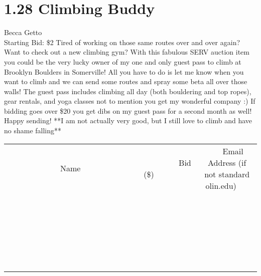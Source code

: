 \documentclass[11pt]{article}
\begin{document}
\section*{1.28 Climbing Buddy}
Becca Getto
\\
Starting Bid: \$2
\newline
Tired of working on those same routes over and over again? Want to check out a new climbing gym? With this fabulous SERV auction item you could be the very lucky owner of my one and only guest pass to climb at Brooklyn Boulders in Somerville! All you have to do is let me know when you want to climb and we can send some routes and spray some beta all over those walls! The guest pass includes climbing all day (both bouldering and top ropes), gear rentals, and yoga classes not to mention you get my wonderful company :) If bidding goes over \$20 you get dibs on my guest pass for a second month as well! Happy sending! **I am not actually very good, but I still love to climb and have no shame falling**
\\[6ex]
\begin{tabular}{c c c}
~~~~~~~~~~~~~Name~~~~~~~~~~~~~ & ~~~~~~~~~Bid (\$)~~~~~~~~~  & ~~~Email Address (if not standard olin.edu)~~~\\
 & & \\
\hline
 & & \\
\hline
 & & \\
\hline
 & & \\
\hline
 & & \\
\hline
 & & \\
\hline
 & & \\
\hline
 & & \\
\hline
 & & \\
\hline
 & & \\
\hline
 & & \\
\hline
 & & \\
\hline
 & & \\
\hline
 & & \\
\hline
 & & \\
\hline
 & & \\
\hline
 & & \\
\hline
 & & \\
\hline
 & & \\
\hline
 & & \\
\hline
 & & \\
\hline
 & & \\
\hline
 & & \\
\hline
 & & \\
\hline
 & & \\
\hline
 & & \\
\hline
\end{tabular}
\newpage
\end{document}
